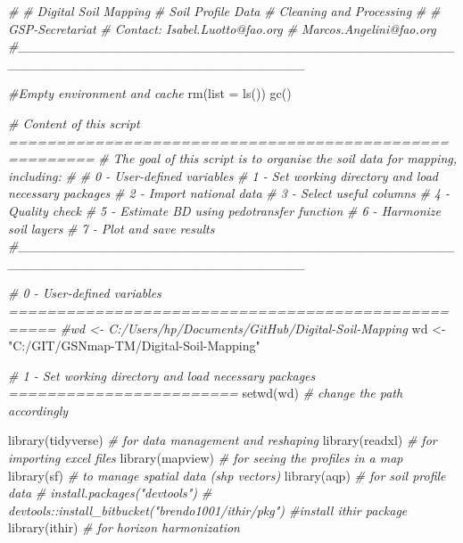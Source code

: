 \documentclass[
  10pt,
  b5paper,
  oneside]{book}
\newenvironment{Shaded}{\begin{snugshade}}{\end{snugshade}}
\newcommand{\AttributeTok}[1]{\textcolor[rgb]{0.77,0.63,0.00}{#1}}
\newcommand{\CommentTok}[1]{\textcolor[rgb]{0.56,0.35,0.01}{\textit{#1}}}
\newcommand{\FunctionTok}[1]{\textcolor[rgb]{0.00,0.00,0.00}{#1}}
\newcommand{\NormalTok}[1]{#1}
\newcommand{\OtherTok}[1]{\textcolor[rgb]{0.56,0.35,0.01}{#1}}
\newcommand{\StringTok}[1]{\textcolor[rgb]{0.31,0.60,0.02}{#1}}
\begin{document}
\begin{Shaded}
\begin{Highlighting}[]
\CommentTok{\#}
\CommentTok{\# Digital Soil Mapping}
\CommentTok{\# Soil Profile Data}
\CommentTok{\# Cleaning and Processing}
\CommentTok{\#}
\CommentTok{\# GSP{-}Secretariat}
\CommentTok{\# Contact: Isabel.Luotto@fao.org}
\CommentTok{\#          Marcos.Angelini@fao.org}
\CommentTok{\#\_\_\_\_\_\_\_\_\_\_\_\_\_\_\_\_\_\_\_\_\_\_\_\_\_\_\_\_\_\_\_\_\_\_\_\_\_\_\_\_\_\_\_\_\_\_\_\_\_\_\_\_\_\_\_\_\_\_\_\_\_\_\_\_\_\_\_\_\_\_\_\_\_\_\_\_\_\_\_}

\CommentTok{\#Empty environment and cache }
\FunctionTok{rm}\NormalTok{(}\AttributeTok{list =} \FunctionTok{ls}\NormalTok{())}
\FunctionTok{gc}\NormalTok{()}

\CommentTok{\# Content of this script =======================================================}
\CommentTok{\# The goal of this script is to organise the soil data for mapping, including:}
\CommentTok{\# }
\CommentTok{\# 0 {-} User{-}defined variables }
\CommentTok{\# 1 {-} Set working directory and load necessary packages}
\CommentTok{\# 2 {-} Import national data }
\CommentTok{\# 3 {-} Select useful columns}
\CommentTok{\# 4 {-} Quality check}
\CommentTok{\# 5 {-} Estimate BD using pedotransfer function}
\CommentTok{\# 6 {-} Harmonize soil layers}
\CommentTok{\# 7 {-} Plot and save results}
\CommentTok{\#\_\_\_\_\_\_\_\_\_\_\_\_\_\_\_\_\_\_\_\_\_\_\_\_\_\_\_\_\_\_\_\_\_\_\_\_\_\_\_\_\_\_\_\_\_\_\_\_\_\_\_\_\_\_\_\_\_\_\_\_\_\_\_\_\_\_\_\_\_\_\_\_\_\_\_\_\_\_\_}

\CommentTok{\# 0 {-} User{-}defined variables ===================================================}
\CommentTok{\#wd \textless{}{-} \textquotesingle{}C:/Users/hp/Documents/GitHub/Digital{-}Soil{-}Mapping\textquotesingle{}}
\NormalTok{wd }\OtherTok{\textless{}{-}} \StringTok{"C:/GIT/GSNmap{-}TM/Digital{-}Soil{-}Mapping"}

\CommentTok{\# 1 {-} Set working directory and load necessary packages ========================}
\FunctionTok{setwd}\NormalTok{(wd) }\CommentTok{\# change the path accordingly}

\FunctionTok{library}\NormalTok{(tidyverse) }\CommentTok{\# for data management and reshaping}
\FunctionTok{library}\NormalTok{(readxl) }\CommentTok{\# for importing excel files}
\FunctionTok{library}\NormalTok{(mapview) }\CommentTok{\# for seeing the profiles in a map}
\FunctionTok{library}\NormalTok{(sf) }\CommentTok{\# to manage spatial data (shp vectors) }
\FunctionTok{library}\NormalTok{(aqp) }\CommentTok{\# for soil profile data}
\CommentTok{\# install.packages("devtools") }
\CommentTok{\# devtools::install\_bitbucket("brendo1001/ithir/pkg") \#install ithir package}
\FunctionTok{library}\NormalTok{(ithir) }\CommentTok{\# for horizon harmonization}



\end{Highlighting}
\end{Shaded}
\end{document}
